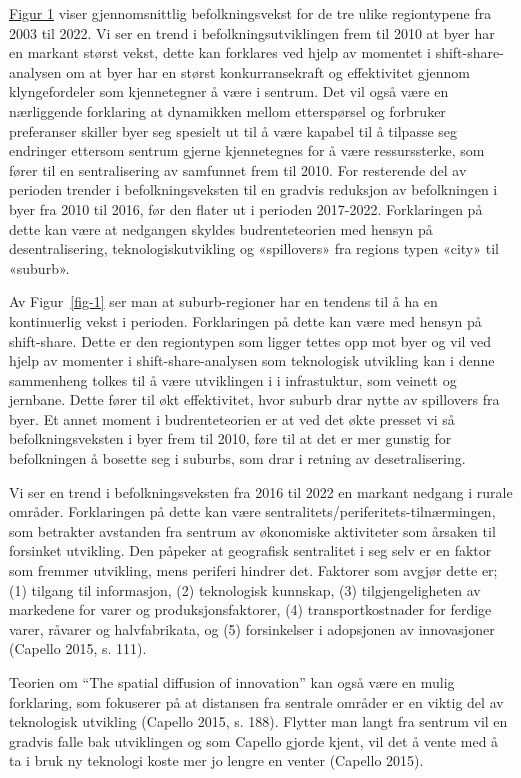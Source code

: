 \documentclass[
  letterpaper,
  DIV=11,
  numbers=noendperiod]{scrartcl}
\begin{document}
\protect\hyperlink{fig-1}{Figur 1} viser gjennomsnittlig
befolkningsvekst for de tre ulike regiontypene fra 2003 til 2022. Vi ser
en trend i befolkningsutviklingen frem til 2010 at byer har en markant
størst vekst, dette kan forklares ved hjelp av momentet i
shift-share-analysen om at byer har en størst konkurransekraft og
effektivitet gjennom klyngefordeler som kjennetegner å være i sentrum.
Det vil også være en nærliggende forklaring at dynamikken mellom
etterspørsel og forbruker preferanser skiller byer seg spesielt ut til å
være kapabel til å tilpasse seg endringer ettersom sentrum gjerne
kjennetegnes for å være ressurssterke, som fører til en sentralisering
av samfunnet frem til 2010. For resterende del av perioden trender i
befolkningsveksten til en gradvis reduksjon av befolkningen i byer fra
2010 til 2016, før den flater ut i perioden 2017-2022. Forklaringen på
dette kan være at nedgangen skyldes budrenteteorien med hensyn på
desentralisering, teknologiskutvikling og «spillovers» fra regions typen
«city» til «suburb».

Av Figur~\ref{fig-1} ser man at suburb-regioner har en tendens til å ha
en kontinuerlig vekst i perioden. Forklaringen på dette kan være med
hensyn på shift-share. Dette er den regiontypen som ligger tettes opp
mot byer og vil ved hjelp av momenter i shift-share-analysen som
teknologisk utvikling kan i denne sammenheng tolkes til å være
utviklingen i i infrastuktur, som veinett og jernbane. Dette fører til
økt effektivitet, hvor suburb drar nytte av spillovers fra byer. Et
annet moment i budrenteteorien er at ved det økte presset vi så
befolkningsveksten i byer frem til 2010, føre til at det er mer gunstig
for befolkningen å bosette seg i suburbs, som drar i retning av
desetralisering.

Vi ser en trend i befolkningsveksten fra 2016 til 2022 en markant
nedgang i rurale områder. Forklaringen på dette kan være
sentralitets/periferitets-tilnærmingen, som betrakter avstanden fra
sentrum av økonomiske aktiviteter som årsaken til forsinket utvikling.
Den påpeker at geografisk sentralitet i seg selv er en faktor som
fremmer utvikling, mens periferi hindrer det. Faktorer som avgjør dette
er; (1) tilgang til informasjon, (2) teknologisk kunnskap, (3)
tilgjengeligheten av markedene for varer og produksjonsfaktorer, (4)
transportkostnader for ferdige varer, råvarer og halvfabrikata, og (5)
forsinkelser i adopsjonen av innovasjoner (Capello 2015, s. 111).

Teorien om ``The spatial diffusion of innovation'' kan også være en
mulig forklaring, som fokuserer på at distansen fra sentrale områder er
en viktig del av teknologisk utvikling (Capello 2015, s. 188). Flytter
man langt fra sentrum vil en gradvis falle bak utviklingen og som
Capello gjorde kjent, vil det å vente med å ta i bruk ny teknologi koste
mer jo lengre en venter (Capello 2015).
\end{document}
